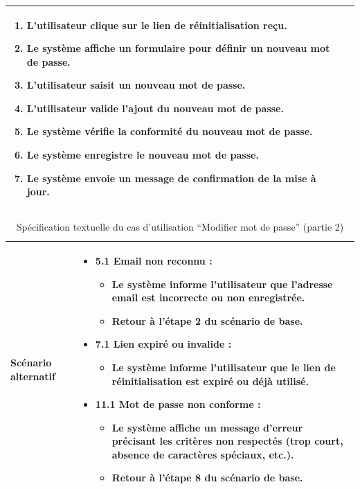 \documentclass[a4paper,11pt]{report}
\begin{document}
\begin{table}[H]
\begin{tabularx}{\textwidth}{|l|X|}
\begin{enumerate}[leftmargin=*]
        \item L’utilisateur clique sur le lien de réinitialisation reçu.
        \item Le système affiche un formulaire pour définir un nouveau mot de passe.
        \item L’utilisateur saisit un nouveau mot de passe.
        \item L’utilisateur valide l’ajout du nouveau mot de passe.
        \item Le système vérifie la conformité du nouveau mot de passe.
        \item Le système enregistre le nouveau mot de passe.
        \item Le système envoie un message de confirmation de la mise à jour.
      \end{enumerate} \\ \hline
  \end{tabularx}
\end{table}

\newpage
\begin{table}[H]
  \centering
  \renewcommand{\arraystretch}{1.5}
  \caption{Spécification textuelle du cas d'utilisation “Modifier mot de passe” (partie 2)}
  \begin{tabularx}{\textwidth}{|l|X|}
    \hline
    \textbf{Scénario alternatif} & 
      \begin{itemize}[leftmargin=*]
        \item \textbf{5.1 Email non reconnu :}
          \begin{itemize}[leftmargin=1em]
            \item Le système informe l’utilisateur que l’adresse email est incorrecte ou non enregistrée.
            \item Retour à l’étape 2 du scénario de base.
          \end{itemize}
        \item \textbf{7.1 Lien expiré ou invalide :}
          \begin{itemize}[leftmargin=1em]
            \item Le système informe l’utilisateur que le lien de réinitialisation est expiré ou déjà utilisé.
          \end{itemize}
        \item \textbf{11.1 Mot de passe non conforme :}
          \begin{itemize}[leftmargin=1em]
            \item Le système affiche un message d’erreur précisant les critères non respectés (trop court, absence de caractères spéciaux, etc.).
            \item Retour à l’étape 8 du scénario de base.
          \end{itemize}
      \end{itemize} \\ \hline
  \end{tabularx}
\end{table}
\end{document}
